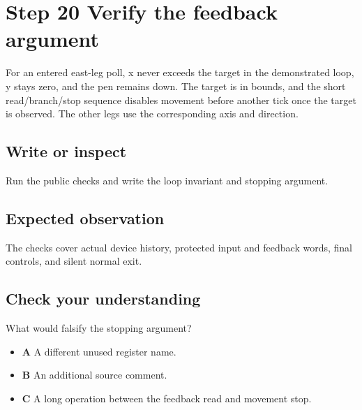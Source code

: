 \section{Step 20 Verify the feedback
  argument}\label{006-marsbot-square-s20-step-20-verify-the-feedback-argument}

For an entered east-leg poll, x never exceeds the target in the
demonstrated loop, y stays zero, and the pen remains down. The target is
in bounds, and the short read/branch/stop sequence disables movement
before another tick once the target is observed. The other legs use the
corresponding axis and direction.

\subsection{Write or
  inspect}\label{006-marsbot-square-s20-write-or-inspect}

Run the public checks and write the loop invariant and stopping
argument.

\subsection{Expected
  observation}\label{006-marsbot-square-s20-expected-observation}

The checks cover actual device history, protected input and feedback
words, final controls, and silent normal exit.

\subsection{Check your
  understanding}\label{006-marsbot-square-s20-check-your-understanding}

What would falsify the stopping argument?

\begin{itemize}
  \tightlist
  \item
        \textbf{A} A different unused register name.
  \item
        \textbf{B} An additional source comment.
  \item
        \textbf{C} A long operation between the feedback read and movement
        stop.
\end{itemize}

